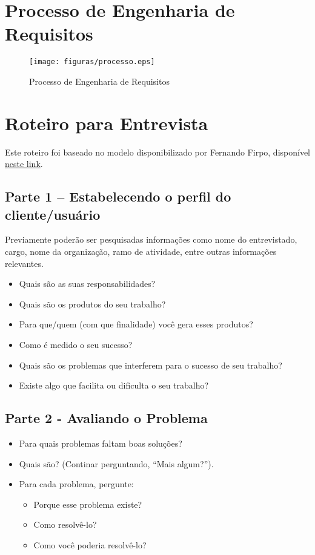 \begin{anexosenv}

\partanexos

\chapter{Processo de Engenharia de Requisitos}
\label{annex:processo}

\begin{figure}[!h]
        \centering
        \texttt{[image: figuras/processo.eps]}
        \caption{Processo de Engenharia de Requisitos}
\end{figure}


\chapter{Roteiro para Entrevista}
\label{annex:roteiro}

Este roteiro foi baseado no modelo disponibilizado por Fernando Firpo, disponível \href{http://analiserequisitos.blogspot.com.br/2011/07/processos-de-obtencao-de-requisitos.html}{neste link}.

\section{Parte 1 – Estabelecendo o perfil do cliente/usuário}
Previamente poderão ser pesquisadas informações como nome do entrevistado, cargo, nome da organização, ramo de atividade, entre outras informações relevantes.

\begin{itemize}
  \item Quais são as suas responsabilidades?
  \item Quais são os produtos do seu trabalho?
  \item Para que/quem (com que finalidade) você gera esses produtos?
  \item Como é medido o seu sucesso?
  \item Quais são os problemas que interferem para o sucesso de seu trabalho?
  \item Existe algo que facilita ou dificulta o seu trabalho?
\end{itemize}

\section{Parte 2 - Avaliando o Problema}
\begin{itemize}
  \item Para quais problemas faltam boas soluções?
  \item Quais são? (Continar perguntando, “Mais algum?”).
  \item Para cada problema, pergunte:
    \begin{itemize}
      \item Porque esse problema existe?
      \item Como resolvê-lo?
      \item Como você poderia resolvê-lo?
    \end{itemize}
\end{itemize}


\end{anexosenv}
